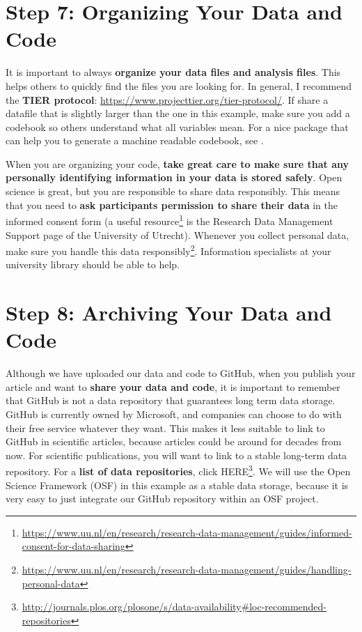 \documentclass[
  oneside]{krantz}
\renewcommand{\href}[2]{#2\footnote{\url{#1}}}
\begin{document}
\hypertarget{step-7-organizing-your-data-and-code}{%
\section{Step 7: Organizing Your Data and Code}\label{step-7-organizing-your-data-and-code}}

It is important to always \textbf{organize your data files and analysis files}. This
helps others to quickly find the files you are looking for. In general, I
recommend the \textbf{TIER protocol}: \url{https://www.projecttier.org/tier-protocol/}.
If share a datafile that is slightly larger than the one in this example, make
sure you add a codebook so others understand what all variables mean. For a nice package that can help you to generate a machine readable codebook, see \citet{arslan_how_2019}.

When you are organizing your code, \textbf{take great care to make sure that any personally identifying information in your data is stored safely}. Open science is great, but you are responsible to share data responsibly. This means that you need to \textbf{ask participants permission to share their data} in the informed consent form (a \href{https://www.uu.nl/en/research/research-data-management/guides/informed-consent-for-data-sharing}{useful resource}
is the Research Data Management Support page of the University of Utrecht).
Whenever you collect personal data, make sure you \href{https://www.uu.nl/en/research/research-data-management/guides/handling-personal-data}{handle this data responsibly}. Information specialists at your university library should be able to help.

\hypertarget{step-8-archiving-your-data-and-code}{%
\section{Step 8: Archiving Your Data and Code}\label{step-8-archiving-your-data-and-code}}

Although we have uploaded our data and code to GitHub, when you publish your article and want to \textbf{share your data and code}, it is important to remember that GitHub is not a data repository that guarantees long term data storage.
GitHub is currently owned by Microsoft, and companies can choose to do with their free service whatever they want. This makes it less suitable to link to GitHub in scientific articles, because articles could be around for decades from now. For scientific publications, you will want to link to a stable long-term data repository. For a \textbf{list of data repositories}, click \href{http://journals.plos.org/plosone/s/data-availability\#loc-recommended-repositories}{HERE}.
We will use the Open Science Framework (OSF) in this example as a stable data storage, because it is very easy to just integrate our GitHub repository within an OSF project.
\end{document}
